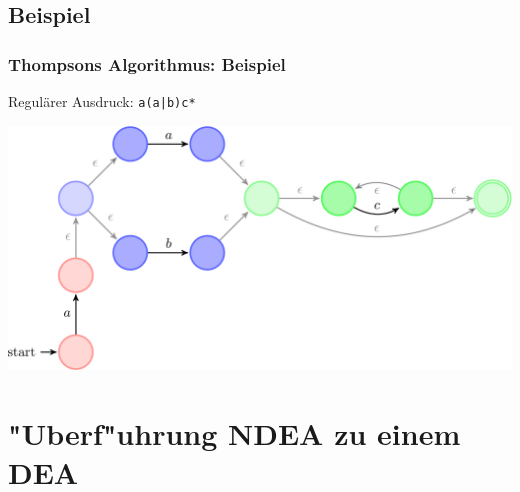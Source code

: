 \documentclass[ignorenonframetext]{beamer}
\begin{document}
\subsection{Beispiel}
\begin{frame}
    \frametitle{Thompsons Algorithmus: Beispiel}
    
    Regulärer Ausdruck: \texttt{a(a|b)c*}
    \vspace{0.5cm}
	
    \begin{centering}
		\includegraphics[scale=0.23]{aabc.pdf}
	\end{centering}
\end{frame}




\section{"Uberf"uhrung NDEA zu einem DEA}
\end{document}
